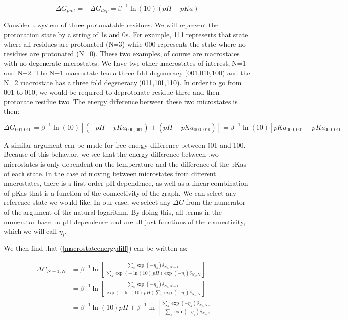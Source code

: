 \begin{equation}
  \Delta G_{prot} = -\Delta G_{dep} = \beta^{-1} \ln(10)(pH-pKa)
\end{equation}

Consider a system of three protonatable residues. We will represent
the protonation state by a string of 1s and 0s. For example, 111
represents that state where all residues are protonated (N=3) while
000 represents the state where no residues are protonated (N=0). These
two examples, of course are macrostates with no degenerate
microstates. We have two other macrostates of interest, N=1 and
N=2. The N=1 macrostate has a three fold degeneracy (001,010,100) and
the N=2 macrostate has a three fold degeneracy (011,101,110). In order
to go from 001 to 010, we would be required to deprotonate residue
three and then protonate residue two. The energy difference between
these two microstates is then:

\begin{equation}
  \Delta G_{001,010} = \beta^{-1} \ln(10)\left[ (-pH + pKa_{000,001}) + (pH - pKa_{000,010}) \right] = \beta^{-1} \ln(10) \left[ pKa_{000,001} - pKa_{000,010}\right]
\end{equation}

A similar argument can be made for free energy difference between 001
and 100. Because of this behavior, we see that the energy difference
between two microstates is only dependent on the temperature and the
difference of the pKas of each state. In the case of moving between
microstates from different macrostates, there is a first order pH
dependence, as well as a linear combination of pKas that is a function
of the connectivity of the graph. We can select any reference state we
would like. In our case, we select any $\Delta G$ from the numerator
of the argument of the natural logarithm. By doing this, all terms in
the numerator have no pH dependence and are all just functions of the
connectivity, which we will call $\eta_i$.

We then find that (\ref{macrostateenergydiff}) can be written as:

\begin{align*}
  \Delta G_{N-1,N} &= \beta^{-1} \ln \left[ \frac{\sum_s \exp(-\eta_s) \delta_{N_s,N-1}}{\sum_s \exp(-\ln(10)\,pH)\exp(-\eta_s) \delta_{N_s,N}} \right] \\
  &= \beta^{-1} \ln \left[ \frac{\sum_s \exp(-\eta_s) \delta_{N_s,N-1}}{\exp(-\ln(10)\,pH) \sum_s \exp(-\eta_s) \delta_{N_s,N}} \right] \\
  &= \beta^{-1} \ln(10) pH + \beta^{-1} \ln \left[ \frac{\sum_s \exp(-\eta_s) \delta_{N_s,N-1}}{\sum_s \exp(- \eta_s) \delta_{N_s,N}} \right] 
\end{align*}

